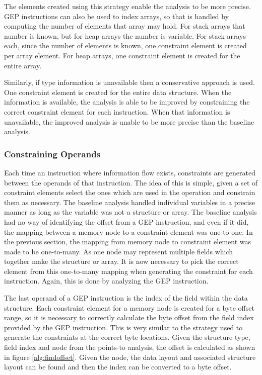 The elements created using this strategy enable the analysis to be more precise.
GEP instructions can also be used to index arrays, so that is handled by
computing the number of elements that array may hold. For stack arrays that
number is known, but for heap arrays the number is variable. For stack arrays
each, since the number of elements is known, one constraint element is created
per array element. For heap arrays, one constraint element is created for the
entire array.

Similarly, if type information is unavailable then a conservative approach is
used. One constraint element is created for the entire data structure. When
the information is available, the analysis is able to be improved by
constraining the correct constraint element for each instruction. When that
information is unavailable, the improved analysis is unable to be more precise
than the baseline analysis.

\subsubsection{Constraining Operands}
Each time an instruction where information flow exists, constraints are
generated between the operands of that instruction. The idea of this is simple,
given a set of constraint elements select the ones which are used in the
operation and constrain them as necessary. The baseline analysis handled
individual variables in a precise manner as long as the variable was not a
structure or array. The baseline analysis had no way of identifying the offset
from a GEP instruction, and even if it did, the mapping between a memory node to
a constraint element was one-to-one. In the previous section, the mapping from
memory node to constraint element was made to be one-to-many. As one node may
represent multiple fields which together make the structure or array. It is now
necessary to pick the correct element from this one-to-many mapping when
generating the constraint for each instruction. Again, this is done by analyzing
the GEP instruction.

The last operand of a GEP instruction is the index of the field within the data
structure. Each constraint element for a memory node is created for a byte
offset range, so it is necessary to correctly calculate the byte offset from the
field index provided by the GEP instruction. This is very similar to the
strategy used to generate the constraints at the correct byte locations. Given
the structure type, field index and node from the points-to analysis, the offset
is calculated as shown in figure \ref{alg:findoffset}. Given the node, the
data layout and associated structure layout can be found and then the index can
be converted to a byte offset.

